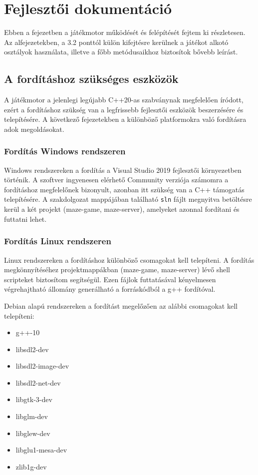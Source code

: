 \chapter{Fejlesztői dokumentáció} %
\label{ch:impl}

Ebben a fejezetben a játékmotor működését és felépítését fejtem ki részletesen. Az alfejezetekben, a 3.2 ponttól külön kifejtésre kerülnek a játékot alkotó osztályok használata, illetve a főbb metódusaikhoz biztosítok bővebb leírást.

\section{A fordításhoz szükséges eszközök}

A játékmotor a jelenlegi legújabb C++20-as szabványnak megfelelően íródott, ezért a fordításhoz szükség van a legfrissebb fejlesztői eszközök beszerzésére és telepítésére. A következő fejezetekben a különböző platformokra való fordításra adok megoldásokat.

\subsection{Fordítás Windows rendszeren}

Windows rendszereken a fordítás a Visual Studio 2019 fejlesztői környezetben történik. A szoftver ingyenesen elérhető Community verziója számomra a fordításhoz megfelelőnek bizonyult, azonban itt szükség van a C++ támogatás telepítésére. A szakdolgozat mappájában található \verb|sln| fájlt megnyitva betöltésre kerül a két projekt (maze-game, maze-server), amelyeket azonnal fordítani és futtatni lehet.

\subsection{Fordítás Linux rendszeren}

Linux rendszereken a fordításhoz különböző csomagokat kell telepíteni. A fordítás megkönnyítéséhez projektmappákban (maze-game, maze-server) lévő shell scripteket biztosítom segítségül. Ezen fájlok futtatásával kényelmesen végrehajtható állomány generálható a forráskódból a g++ fordítóval.

Debian alapú rendszereken a fordítást megelőzően az alábbi csomagokat kell telepíteni:

\begin{itemize}
	\item g++-10
	\item libsdl2-dev
	\item libsdl2-image-dev
	\item libsdl2-net-dev
	\item libgtk-3-dev
	\item libglm-dev
	\item libglew-dev
	\item libglu1-mesa-dev
	\item zlib1g-dev
\end{itemize}

